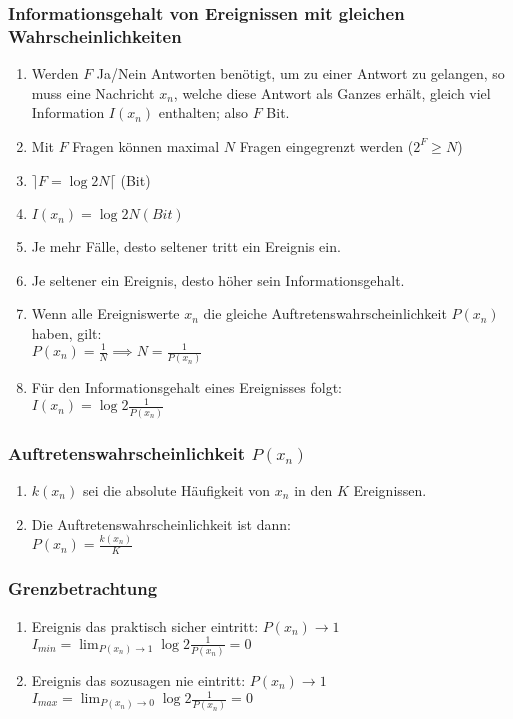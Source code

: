\subsubsection{Informationsgehalt von Ereignissen mit gleichen Wahrscheinlichkeiten}%
\begin{enumerate}
	\item Werden $F$ Ja/Nein Antworten benötigt, um zu einer Antwort zu gelangen, so muss eine Nachricht
	$x_n$, welche diese Antwort als Ganzes erhält, gleich viel Information $I(x_n)$ enthalten; also $F$ Bit.
	\item Mit $F$ Fragen können maximal $N$ Fragen eingegrenzt werden ($2^F \geq N$)
	\item $\rceil F = \log{2}{N} \lceil$ (Bit)
	\item $I(x_n) = \log{2}{N} (Bit)$
	\item Je mehr Fälle, desto seltener tritt ein Ereignis ein.
	\item Je seltener ein Ereignis, desto höher sein Informationsgehalt.
	\item Wenn alle Ereigniswerte $x_n$ die gleiche Auftretenswahrscheinlichkeit $P(x_n)$ haben, gilt: \\
		$P(x_n) = \frac{1}{N} \implies N=\frac{1}{P(x_n)}$
	\item Für den Informationsgehalt eines Ereignisses folgt: \\
		$I(x_n) = \log{2}{\frac{1}{P(x_n)}}$
\end{enumerate}

\subsubsection{Auftretenswahrscheinlichkeit $P(x_n)$}%
\begin{enumerate}
	\item $k(x_n)$ sei die absolute Häufigkeit von $x_n$ in den $K$ Ereignissen.
	\item Die Auftretenswahrscheinlichkeit ist dann: \\
		$P(x_n) = \frac{k(x_n)}{K}$
\end{enumerate}

\subsubsection{Grenzbetrachtung}%
\label{ssub:grenzbetrachtung}
\begin{enumerate}
	\item Ereignis das praktisch sicher eintritt: $P(x_n) \rightarrow 1$ \\
		$I_{min} = \lim_{P(x_n) \to 1} \log{2}{\frac{1}{P(x_n)} = 0}$
	\item Ereignis das sozusagen nie eintritt: $P(x_n)\rightarrow 1$ \\
		$I_{max} = \lim_{P(x_n) \to 0} \log{2}{\frac{1}{P(x_n)}=0}$
\end{enumerate}

